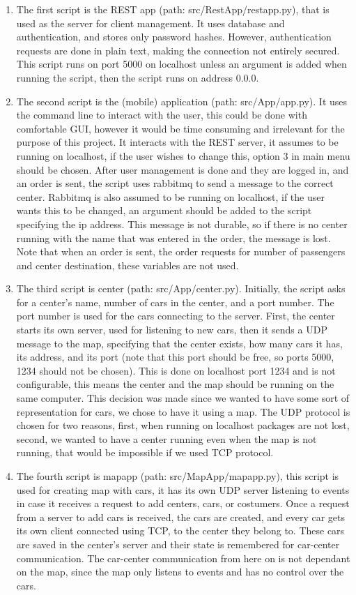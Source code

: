 \documentclass[a4paper]{article}
\begin{document}
\begin{enumerate}
    \item The first script is the REST app (path: src/RestApp/restapp.py), that is used as the server for client management. It uses database and authentication, and stores only password hashes. However, authentication requests are done in plain text, making the connection not entirely secured. This script runs on port 5000 on localhost unless an argument is added when running the script, then the script runs on address 0.0.0.
    \item The second script is the (mobile) application (path: src/App/app.py). It uses the command line to interact with the user, this could be done with comfortable GUI, however it would be time consuming and irrelevant for the purpose of this project. It interacts with the REST server, it assumes to be running on localhost, if the user wishes to change this, option 3 in main menu should be chosen. After user management is done and they are logged in, and an order is sent, the script uses rabbitmq to send a message to the correct center. Rabbitmq is also assumed to be running on localhost, if the user wants this to be changed, an argument should be added to the script specifying the ip address. This message is not durable, so if there is no center running with the name that was entered in the order, the message is lost. Note that when an order is sent, the order requests for number of passengers and center destination, these variables are not used.
    \item The third script is center (path: src/App/center.py). Initially, the script asks for a center's name, number of cars in the center, and a port number. The port number is used for the cars connecting to the server. First, the center starts its own server, used for listening to new cars, then it sends a UDP message to the map, specifying that the center exists, how many cars it has, its address, and its port (note that this port should be free, so ports 5000, 1234 should not be chosen). This is done on localhost port 1234 and is not configurable, this means the center and the map should be running on the same computer. This decision was made since we wanted to have some sort of representation for cars, we chose to have it using a map. The UDP protocol is chosen for two reasons, first, when running on localhost packages are not lost, second, we wanted to have a center running even when the map is not running, that would be impossible if we used TCP protocol.
    \item The fourth script is mapapp (path: src/MapApp/mapapp.py), this script is used for creating map with cars, it has its own UDP server listening to events in case it receives a request to add centers, cars, or costumers. Once a request from a server to add cars is received, the cars are created, and every car gets its own client connected using TCP, to the center they belong to. These cars are saved in the center's server and their state is remembered for car-center communication. The car-center communication from here on is not dependant on the map, since the map only listens to events and has no control over the cars.
\end{enumerate}
\end{document}
